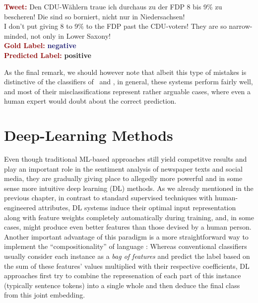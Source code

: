 \begin{example}\label{snt:cgsa:exmp:guenther-error}
  \noindent\textup{\bfseries\textcolor{darkred}{Tweet:}} {\upshape Den CDU-W\"ahlern traue ich durchaus zu der FDP 8 bis 9\% zu bescheren! Die sind so borniert, nicht nur in Niedersachsen!}\\
  \noindent I don't put giving 8 to 9\% to the FDP past the CDU-voters!  They are so narrow-minded, not only in Lower Saxony!\\[\exampleSep]
  \noindent\textup{\bfseries\textcolor{darkred}{Gold Label:}}\hspace*{4.3em}\textbf{%
    \upshape\textcolor{midnightblue}{negative}}\\
 \noindent\textup{\bfseries\textcolor{darkred}{Predicted Label:}}\hspace*{2em}\textbf{%
    \upshape\textcolor{green3}{positive}}
\end{example}

As the final remark, we should however note that albeit this type of
mistakes is distinctive of the classifiers of~\citet{Mohammad:13} and
\citet{Guenther:14}, in general, these systems perform fairly well,
and most of their misclassifications represent rather arguable cases,
where even a human expert would doubt about the correct prediction.

\section{Deep-Learning Methods}\label{sec:cgsa:dl-based}

Even though traditional ML-based approaches still yield competitve
results and play an important role in the sentiment analysis of
newspaper texts and social media, they are gradually giving place to
allegedly more powerful and in some sense more intuitive deep learning
(DL) methods.  As we already mentioned in the previous chapter, in
contrast to standard supervised techniques with human-engineered
attributes, DL systems induce their optimal input representation along
with feature weights completely automatically during training, and, in
some cases, might produce even better features than those devised by a
human person.  Another important advantage of this paradigm is a more
straightforward way to implement the ``compositionality'' of language
\cite{Frege:1892}: Whereas conventional classifiers usually consider
each instance as a \emph{bag of features} and predict the label based
on the sum of these features' values multiplied with their respective
coefficients, DL approaches first try to combine the represenation of
each part of this instance (typically sentence tokens) into a single
whole and then deduce the final class from this joint embedding.

